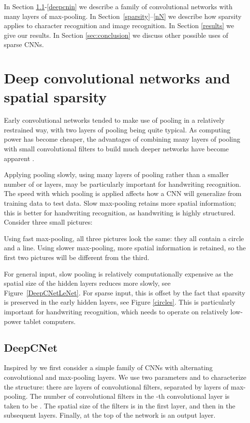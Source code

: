 \documentclass{article}
\numberwithin{equation}{subsection}
\begin{document}
In Section \ref{deepcnet}-\ref{deepcnin} we describe a family of convolutional networks with many layers of max-pooling. In Section~\ref{sparsity}--\ref{nN} we describe how sparsity applies to character recognition and image recognition. In Section \ref{results} we give our results. In Section \ref{sec:conclusion} we discuss other possible uses of sparse CNNs.

\section{Deep convolutional networks and spatial sparsity}\label{DeepCNN}
Early convolutional networks tended to make use of pooling in a relatively restrained way, with two layers of pooling being quite typical. As computing power has become cheaper, the advantages of combining many layers of pooling with small convolutional filters to build much deeper networks have become apparent \cite{multicolumndeep,NetworkInNetwork}.

Applying pooling slowly, using many layers of  pooling rather than a smaller number of  or  layers, may be particularly important for handwriting recognition.
The speed with which pooling is applied affects how a CNN will generalize from training data to test data. Slow max-pooling retains more spatial information; this is better for handwriting recognition, as handwriting is highly structured. Consider three small pictures:

Using fast max-pooling, all three pictures look the same: they all contain a circle and a line.
Using slower max-pooling, more spatial information is retained, so the first two pictures will be different from the third.

For general input, slow pooling is relatively computationally expensive as the spatial size of the hidden layers reduces more slowly, see Figure~\ref{DeepCNetLeNet}. For sparse input, this is offset by the fact that sparsity is preserved in the early hidden layers, see Figure \ref{circles}. This is particularly important for handwriting recognition, which needs to operate on relatively low-power tablet computers.

\subsection{DeepCNet}\label{deepcnet}
Inspired by \cite{multicolumndeep} we first consider a simple family of CNNs with alternating convolutional and max-pooling layers. We use two parameters  and  to characterize the structure:
there are  layers of convolutional filters, separated by  layers of  max-pooling.
The number of convolutional filters in the -th convolutional layer is taken to be .
The spatial size of the filters is  in the first layer, and then  in the subsequent layers. Finally, at the top of the network is an output layer.
\end{document}
